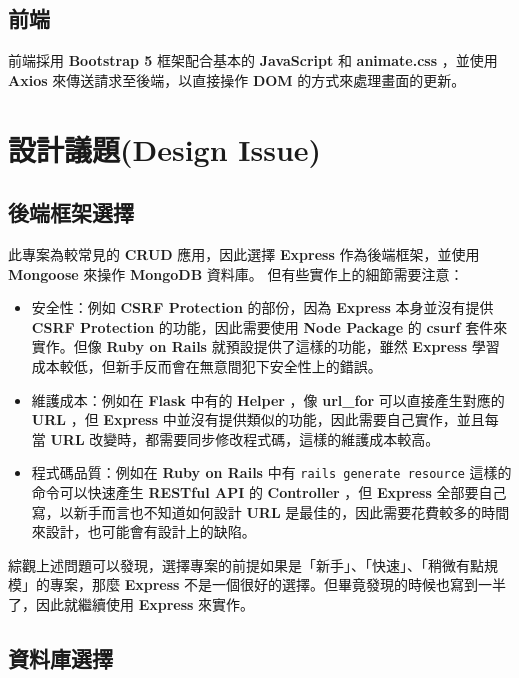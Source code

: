 \documentclass{article}
\begin{document}
\subsection{前端}

前端採用 \textbf{Bootstrap 5} 框架配合基本的 \textbf{JavaScript} 和 \textbf{animate.css} ，並使用 \textbf{Axios} 來傳送請求至後端，以直接操作 \textbf{DOM} 的方式來處理畫面的更新。

\newpage

\section[設計議題(DESIGN ISSUE)]{設計議題(Design Issue)}

\subsection{後端框架選擇}

此專案為較常見的 \textbf{CRUD} 應用，因此選擇 \textbf{Express} 作為後端框架，並使用 \textbf{Mongoose} 來操作 \textbf{MongoDB} 資料庫。
但有些實作上的細節需要注意：

\begin{itemize}
	\item 安全性：例如 \textbf{CSRF Protection} 的部份，因為 \textbf{Express} 本身並沒有提供 \textbf{CSRF Protection} 的功能，因此需要使用 \textbf{Node Package} 的 \textbf{csurf} 套件來實作。但像 \textbf{Ruby on Rails} 就預設提供了這樣的功能，雖然 \textbf{Express} 學習成本較低，但新手反而會在無意間犯下安全性上的錯誤。
	\item 維護成本：例如在 \textbf{Flask} 中有的 \textbf{Helper} ，像 \textbf{url\_for} 可以直接產生對應的 \textbf{URL} ，但 \textbf{Express} 中並沒有提供類似的功能，因此需要自己實作，並且每當 \textbf{URL} 改變時，都需要同步修改程式碼，這樣的維護成本較高。
	\item 程式碼品質：例如在 \textbf{Ruby on Rails} 中有 \verb|rails generate resource| 這樣的命令可以快速產生 \textbf{RESTful API} 的 \textbf{Controller} ，但 \textbf{Express} 全部要自己寫，以新手而言也不知道如何設計 \textbf{URL} 是最佳的，因此需要花費較多的時間來設計，也可能會有設計上的缺陷。
\end{itemize}

綜觀上述問題可以發現，選擇專案的前提如果是「新手」、「快速」、「稍微有點規模」的專案，那麼 \textbf{Express} 不是一個很好的選擇。但畢竟發現的時候也寫到一半了，因此就繼續使用 \textbf{Express} 來實作。

\subsection{資料庫選擇}
\end{document}
